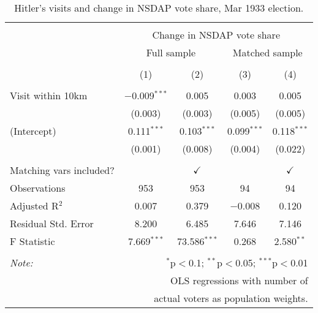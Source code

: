 
\begin{table}[!htbp] \centering 
  \caption{Hitler's visits and change in NSDAP vote share, Mar 1933 election.} 
  \label{tab:ols-d_p_nsdap-4} 
\begin{tabular}{@{\extracolsep{5pt}}lcccc} 
\\[-1.8ex]\hline 
\hline \\[-1.8ex] 
 & \multicolumn{4}{c}{Change in NSDAP vote share} \\ 
\cline{2-5} 
 & \multicolumn{2}{c}{Full sample} & \multicolumn{2}{c}{Matched sample} \\ 
\\[-1.8ex] & (1) & (2) & (3) & (4)\\ 
\hline \\[-1.8ex] 
 Visit within 10km & $-$0.009$^{***}$ & 0.005 & 0.003 & 0.005 \\ 
  & (0.003) & (0.003) & (0.005) & (0.005) \\ 
  (Intercept) & 0.111$^{***}$ & 0.103$^{***}$ & 0.099$^{***}$ & 0.118$^{***}$ \\ 
  & (0.001) & (0.008) & (0.004) & (0.022) \\ 
 \hline \\[-1.8ex] 
Matching vars included? &  & \multicolumn{1}{c}{$\checkmark$} &  & \multicolumn{1}{c}{$\checkmark$} \\ 
Observations & 953 & 953 & 94 & 94 \\ 
Adjusted R$^{2}$ & 0.007 & 0.379 & $-$0.008 & 0.120 \\ 
Residual Std. Error & 8.200 & 6.485 & 7.646 & 7.146 \\ 
F Statistic & 7.669$^{***}$ & 73.586$^{***}$ & 0.268 & 2.580$^{**}$ \\ 
\hline 
\hline \\[-1.8ex] 
\textit{Note:}  & \multicolumn{4}{r}{$^{*}$p$<$0.1; $^{**}$p$<$0.05; $^{***}$p$<$0.01} \\ 
 & \multicolumn{4}{r}{OLS regressions with number of} \\ 
 & \multicolumn{4}{r}{actual voters as population weights.} \\ 
\end{tabular} 
\end{table} 
